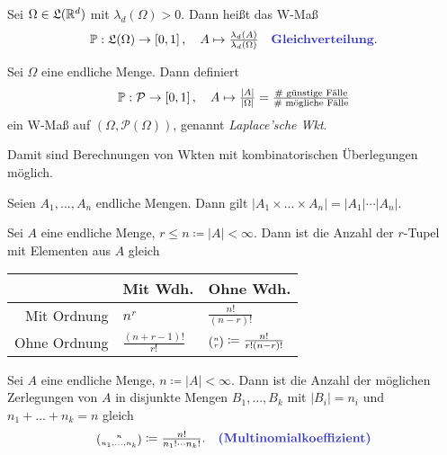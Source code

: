 \documentclass{cheat-sheet}
\newcommand{\LebAlg}{\mathfrak{L}} %
\renewcommand{\P}{\mathbb{P}} %
\let\myBinom\binom
\renewcommand{\binom}[2]{\mathsmaller{\myBinom{#1}{#2}}}
\begin{document}

\begin{defn}
  Sei $\Omega \in \LebAlg(\R^d)$ mit $\lambda_d(\Omega) > 0$. Dann heißt das W-Maß
  \[ \P : \LebAlg(\Omega) \to \cinterval{0}{1}, \quad A \mapsto \tfrac{\lambda_d(A)}{\lambda_d(\Omega)} \quad \text{\emph{Gleichverteilung}.} \]
\end{defn}

\begin{defn}
  Sei $\Omega$ eine endliche Menge. Dann definiert
  \[ \P : \mathcal{P} \to \cinterval{0}{1}, \quad A \mapsto \tfrac{|A|}{|\Omega|} = \tfrac{\text{\# günstige Fälle}}{\text{\# mögliche Fälle}} \]
  ein W-Maß auf $(\Omega, \mathcal{P}(\Omega))$, genannt \emph{Laplace'sche Wkt}.
\end{defn}

\begin{bem}
  Damit sind Berechnungen von Wkten mit kombinatorischen Überlegungen möglich.
\end{bem}


\begin{lem}
  Seien $A_1, ..., A_n$ endliche Mengen. Dann gilt $| A_1 \times ... \times A_n | = |A_1| \cdots |A_n|$.
\end{lem}

\begin{lem}
  Sei $A$ eine endliche Menge, $r \leq n \coloneqq |A| < \infty$. Dann ist die Anzahl der $r$-Tupel mit Elementen aus $A$ gleich

  \begin{center}
    \begin{tabular}{ r | l l }
      & Mit Wdh. & Ohne Wdh. \\ \hline
      Mit Ordnung & $n^r$ & $\tfrac{n!}{(n-r)!}$ \\
      Ohne Ordnung & $\tfrac{(n+r-1)!}{r!}$ & $\binom{n}{r} \coloneqq \tfrac{n!}{r!(n-r)!}$
    \end{tabular}
  \end{center}
\end{lem}



\begin{lem}
  Sei $A$ eine endliche Menge, $n \coloneqq |A| < \infty$. Dann ist die Anzahl der möglichen Zerlegungen von $A$ in disjunkte Mengen $B_1, ..., B_k$ mit $|B_i| = n_i$ und $n_1 + ... + n_k = n$ gleich
  \[
    \binom{n}{n_1, ..., n_k} \coloneqq \tfrac{n!}{n_1! \cdots n_k!}. \quad \text{\emph{(Multinomialkoeffizient)}}
  \]
\end{lem}
\end{document}
